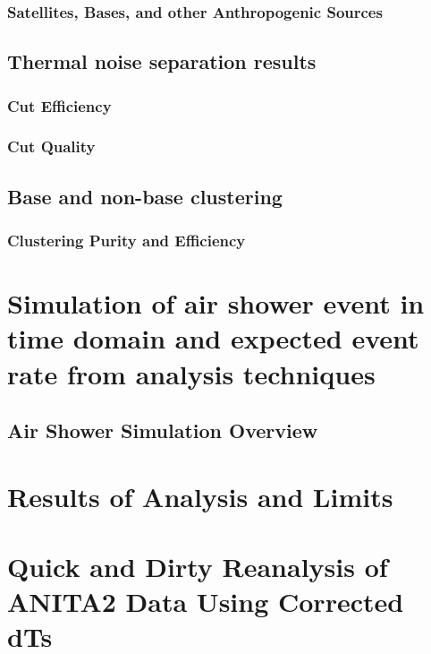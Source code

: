 \documentclass[11pt]{uhthesis}
\begin{document}
	\subsection{Satellites, Bases, and other Anthropogenic Sources}


\section{Thermal noise separation results}
	\subsection{Cut Efficiency}
	
	\subsection{Cut Quality}

\section{Base and non-base clustering}
	\subsection{Clustering Purity and Efficiency}

	

\chapter{Simulation of air shower event in time domain and expected event rate from analysis techniques}
\section{Air Shower Simulation Overview}
	
			
			
\chapter{Results of Analysis and Limits}
			
			
\chapter{Quick and Dirty Reanalysis of ANITA2 Data Using Corrected dTs}
			
\end{document}
